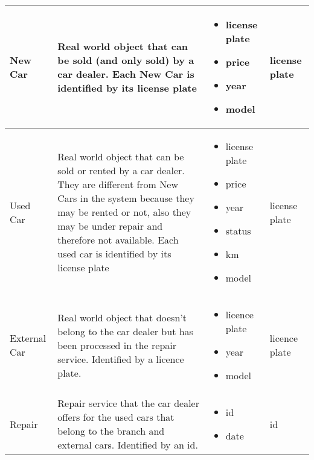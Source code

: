 \begin{longtable}{|p{}|p{} |p{}|p{} |}
New Car & Real world object that can be sold (and only sold) by a car dealer. Each New Car is identified by its license plate & \begin{itemize}
    \vspace{-1em}
    \item license plate
    \item price
    \item year
    \item model
\end{itemize}
&  license plate\\\hline

Used Car & Real world object that can be sold or rented by a car dealer. They are different from New Cars in the system because they may be rented or not, also they may be under repair and therefore not available. Each used car is identified by its license plate& \begin{itemize}
    \vspace{-1em}
    \item license plate
    \item price
    \item year
    \item status
    \item km
    \item model
\end{itemize}
&  license plate\\\hline

External Car & Real world object that doesn't belong to the car dealer but has been processed in the repair service. Identified by a licence plate. & \begin{itemize}
        \vspace{-1em}
        \item licence plate
		\item year
		\item model
    \end{itemize}
 &  licence plate \\\hline
 
 Repair & Repair service that the car dealer offers for the used cars that belong to the branch and external cars. Identified by an id. & \begin{itemize}
        \vspace{-1em}
        \item id
        \item date
    \end{itemize}
 &  id \\\hline


\end{longtable}
